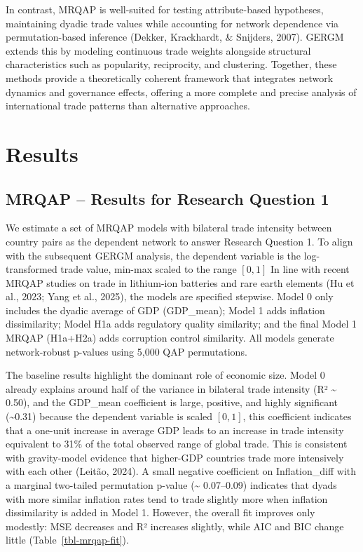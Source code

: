 \documentclass[
]{article}
\begin{document}
In contrast, MRQAP is well-suited for testing attribute-based
hypotheses, maintaining dyadic trade values while accounting for network
dependence via permutation-based inference (Dekker, Krackhardt, \&
Snijders, 2007). GERGM extends this by modeling continuous trade weights
alongside structural characteristics such as popularity, reciprocity,
and clustering. Together, these methods provide a theoretically coherent
framework that integrates network dynamics and governance effects,
offering a more complete and precise analysis of international trade
patterns than alternative approaches.

\section{Results}\label{results}

\subsection{MRQAP -- Results for Research Question
1}\label{mrqap-results-for-research-question-1}

We estimate a set of MRQAP models with bilateral trade intensity between
country pairs as the dependent network to answer Research Question 1. To
align with the subsequent GERGM analysis, the dependent variable is the
log-transformed trade value, min-max scaled to the range \([0, 1]\) In
line with recent MRQAP studies on trade in lithium-ion batteries and
rare earth elements (Hu et al., 2023; Yang et al., 2025), the models are
specified stepwise. Model 0 only includes the dyadic average of GDP
(GDP\_mean); Model 1 adds inflation dissimilarity; Model H1a adds
regulatory quality similarity; and the final Model 1 MRQAP (H1a+H2a)
adds corruption control similarity. All models generate network-robust
p-values using 5,000 QAP permutations.

The baseline results highlight the dominant role of economic size. Model
0 already explains around half of the variance in bilateral trade
intensity (R² \textasciitilde{} 0.50), and the GDP\_mean coefficient is
large, positive, and highly significant (\textasciitilde0.31) because
the dependent variable is scaled \([0, 1]\), this coefficient indicates
that a one-unit increase in average GDP leads to an increase in trade
intensity equivalent to 31\% of the total observed range of global
trade. This is consistent with gravity-model evidence that higher-GDP
countries trade more intensively with each other (Leitão, 2024). A small
negative coefficient on Inflation\_diff with a marginal two-tailed
permutation p-value (\textasciitilde{} 0.07--0.09) indicates that dyads
with more similar inflation rates tend to trade slightly more when
inflation dissimilarity is added in Model 1. However, the overall fit
improves only modestly: MSE decreases and R² increases slightly, while
AIC and BIC change little (Table~\ref{tbl-mrqap-fit}).
\end{document}
